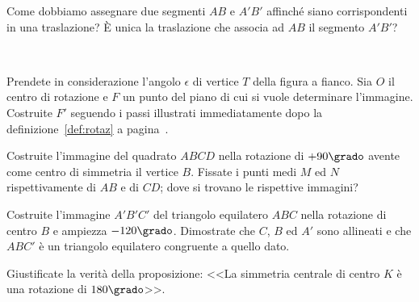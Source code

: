 \begin{esercizio}
\label{ese:8.47} %
Come dobbiamo assegnare due segmenti $AB$ e $A'B'$ affinché siano 
corrispondenti in una traslazione? \`E unica la traslazione che 
associa ad $AB$ il segmento $A'B'$?
\end{esercizio}

\begin{esercizio}
\label{ese:}
~

\noindent\begin{minipage}{.70\textwidth}
Prendete in considerazione l'angolo $\epsilon$ di vertice $T$ della 
figura a fianco. Sia $O$ il centro di rotazione e $F$ un punto del 
piano di cui si vuole determinare l'immagine. Costruite $F'$ seguendo 
i passi illustrati immediatamente dopo la definizione~\ref{def:rotaz} 
a pagina~\pageref{def:rotaz}.
\end{minipage} 
\begin{minipage}{.28\textwidth}
\begin{inaccessibleblock}
\begin{center}  \end{center}
\end{inaccessibleblock}
\end{minipage}
\end{esercizio}

\begin{esercizio}
\label{ese:8.59} %
Costruite l'immagine del quadrato $ABCD$ nella rotazione di 
$+90\grado$ avente come centro di simmetria il vertice $B$.
Fissate i punti medi $M$ ed $N$ rispettivamente di $AB$ e di $CD$; 
dove si trovano le rispettive immagini?
\end{esercizio}

\begin{esercizio}
\label{ese:8.62} %
Costruite l'immagine $A'B'C'$ del triangolo equilatero $ABC$ nella 
rotazione di centro $B$ e ampiezza $-120\grado$. Dimostrate che $C$, 
$B$ ed $A'$ sono allineati e che $ABC'$ è un triangolo equilatero 
congruente a quello dato.
\end{esercizio}

\begin{esercizio}
\label{ese:8.68} %
Giustificate la verità della proposizione: <<La simmetria centrale di 
centro $K$ è una rotazione di $180\grado$>>.
\end{esercizio}

